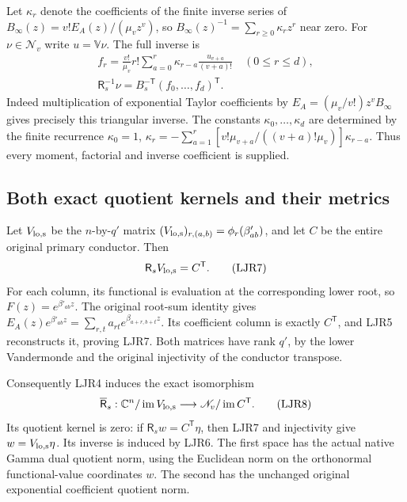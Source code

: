 \documentclass[11pt,a4paper]{article}
\begin{document}
Let $\kappa_r$ denote the coefficients of the finite inverse
series of
$B_\infty(z)=v!E_A(z)/(\mu_vz^v)$, so
$B_\infty(z)^{-1}=\sum_{r\ge0}\kappa_rz^r$ near zero.
For $\nu\in\mathscr N_v$ write $u=\mathbb V\nu$. The full inverse is
\[
 \begin{gathered}
 f_r=\frac{v!}{\mu_v}r!
       \sum_{a=0}^{r}\kappa_{r-a}\frac{u_{v+a}}{(v+a)!}
          \quad(0\le r\le d),\\
 \mathsf R_s^{-1}\nu=B_s^{-\mathsf T}(f_0,\ldots,f_d)^{\mathsf T}.
 \end{gathered}\tag{LJR6}
\]
Indeed multiplication of exponential Taylor coefficients by
$E_A=(\mu_v/v!)z^vB_\infty$ gives precisely this triangular
inverse. The constants $\kappa_0,\ldots,\kappa_d$ are determined
by the finite recurrence
$\kappa_0=1$,
$\kappa_r=-\sum_{a=1}^r[v!\mu_{v+a}/((v+a)!\mu_v)]\kappa_{r-a}$.
Thus every moment, factorial and inverse coefficient is supplied.

\subsection{Both exact quotient kernels and their metrics}

Let $V_{\rm lo,s}$ be the $n$-by-$q'$ matrix
$(V_{\rm lo,s})_{r,(a,b)}=\phi_r(\beta'_{ab})$, and let
$C$ be the entire original primary conductor. Then
\[
 \mathsf R_s V_{\rm lo,s}=C^{\mathsf T}.
 \tag{LJR7}
\]
For each column, its functional is evaluation at the corresponding
lower root, so $F(z)=e^{\beta'_{ab}z}$. The original root-sum
identity gives
$E_A(z)e^{\beta'_{ab}z}=\sum_{r,t}a_{rt}
e^{\beta_{a+r,b+t}z}$. Its coefficient column is exactly
$C^{\mathsf T}$, and LJR5 reconstructs it, proving LJR7.
Both matrices have rank $q'$, by the lower Vandermonde and
the original injectivity of the conductor transpose.

Consequently LJR4 induces the exact isomorphism
\[
 \overline{\mathsf R}_s:
 \mathbb C^n/\operatorname{im}V_{\rm lo,s}
 \longrightarrow
 \mathscr N_v/\operatorname{im}C^{\mathsf T}.
 \tag{LJR8}
\]
Its quotient kernel is zero: if $\mathsf R_sw=C^{\mathsf T}\eta$,
then LJR7 and injectivity give $w=V_{\rm lo,s}\eta$.
Its inverse is induced by LJR6. The first space has the actual
native Gamma dual quotient norm, using the Euclidean norm on the
orthonormal functional-value coordinates $w$. The second has the
unchanged original exponential coefficient quotient norm.
\end{document}
